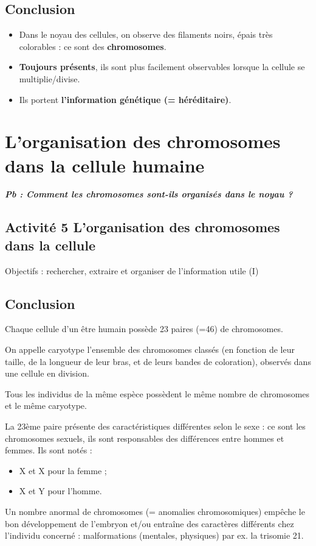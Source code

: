 \subsection{Conclusion}
\begin{itemize}
\item
  Dans le noyau des cellules, on observe des filaments noirs, épais très
  colorables : ce sont des \textbf{chromosomes}.
\item
  \textbf{Toujours présents}, ils sont plus facilement observables
  lorsque la cellule se multiplie/divise.
\item
  Ils portent \textbf{l'information génétique (= héréditaire)}.
\end{itemize}

\section{L'organisation des chromosomes dans la cellule
humaine}

\label{sec:chap1:organisationchromosomes}
\textbf{\emph{Pb : Comment les chromosomes sont-ils organisés dans le
noyau ?}}

\subsection{Activité 5 L'organisation des chromosomes dans la cellule}
Objectifs : rechercher, extraire et organiser de l'information utile (I)

\subsection{Conclusion}

Chaque cellule d'un être humain possède 23 paires (=46) de chromosomes.

On appelle caryotype l'ensemble des chromosomes classés (en fonction de
leur taille, de la longueur de leur bras, et de leurs bandes de
coloration), observés dans une cellule en division.

Tous les individus de la même espèce possèdent le même nombre de
chromosomes et le même caryotype.

La 23ème paire présente des caractéristiques différentes selon le sexe :
ce sont les chromosomes sexuels, ils sont responsables des différences
entre hommes et femmes. Ils sont notés :
\begin{itemize}
\item
  X et X pour la femme ;
\item
  X et Y pour l'homme.
\end{itemize}

Un nombre anormal de chromosomes (= anomalies chromosomiques) empêche le
bon développement de l'embryon et/ou entraîne des caractères différents
chez l'individu concerné : malformations (mentales, physiques) par ex.
la trisomie 21.

